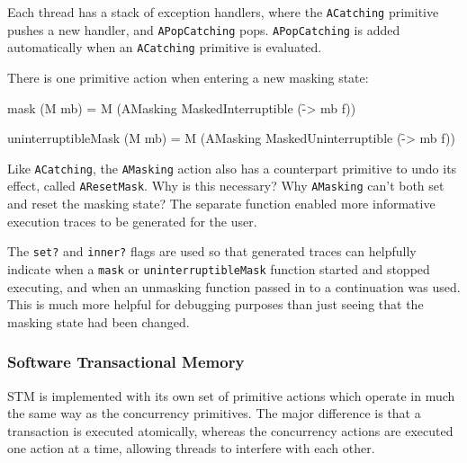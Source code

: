 
Each thread has a stack of exception handlers, where the
\verb|ACatching| primitive pushes a new handler, and
\verb|APopCatching| pops. \verb|APopCatching| is added automatically
when an \verb|ACatching| primitive is evaluated.


There is one primitive action when entering a new masking state:

\begin{haskellcode}
mask (M mb) = M (AMasking MaskedInterruptible (\f -> mb f))

uninterruptibleMask (M mb) = M (AMasking MaskedUninterruptible (\f -> mb f))
\end{haskellcode}


Like \verb|ACatching|, the \verb|AMasking| action also has a
counterpart primitive to undo its effect, called
\verb|AResetMask|. Why is this necessary? Why \verb|AMasking| can't
both set and reset the masking state? The separate function enabled
more informative execution traces to be generated for the user.


The \verb|set?| and \verb|inner?| flags are used so that generated
traces can helpfully indicate when a \verb|mask| or
\verb|uninterruptibleMask| function started and stopped executing, and
when an unmasking function passed in to a continuation was used. This
is much more helpful for debugging purposes than just seeing that the
masking state had been changed.

\subsubsection{Software Transactional Memory}
\label{sec:execution-primops-stm}

STM is implemented with its own set of primitive actions which operate
in much the same way as the concurrency primitives. The major
difference is that a transaction is executed atomically, whereas the
concurrency actions are executed one action at a time, allowing
threads to interfere with each other.

